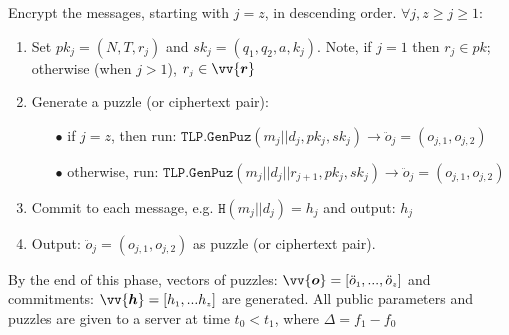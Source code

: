 \begin{enumerate}[leftmargin=.4cm]
Encrypt the  messages, starting with $j=z$, in descending order. $\forall j, z\geq j \geq 1:$
\begin{enumerate}
\item\label{set-pk-in-loop} Set $pk_{\scriptscriptstyle j}=(N,T,r_{\scriptscriptstyle j})$ and $sk_{\scriptscriptstyle j}=(q_{\scriptscriptstyle 1},q_{\scriptscriptstyle 2},a,k_{\scriptscriptstyle j})$. Note, if $j=1$ then $r_{\scriptscriptstyle j} \in pk$; otherwise (when $j>1$), $r_{\scriptscriptstyle j} \in \vv{\bm{r}}$


\item\label{call-RTLP-GenPuz} Generate a puzzle (or ciphertext pair): 
\begin{itemize}
\item[$\bullet$]  if $j=z$, then run: $\mathtt{TLP.GenPuz}(m_{\scriptscriptstyle j}||d_{\scriptscriptstyle j},pk_{\scriptscriptstyle j},sk_{\scriptscriptstyle j})\rightarrow \ddot{o}_{\scriptscriptstyle j}=(o_{\scriptscriptstyle j,1},o_{\scriptscriptstyle j,2})$
 
\item[$\bullet$]  otherwise, run: $\mathtt{TLP.GenPuz}(m_{\scriptscriptstyle j}||d_{\scriptscriptstyle j}||r_{\scriptscriptstyle j+1},pk_{\scriptscriptstyle j},sk_{\scriptscriptstyle j})\rightarrow \ddot{o}_{\scriptscriptstyle j}=(o_{\scriptscriptstyle j,1},o_{\scriptscriptstyle j,2})$
\end{itemize}


\item\label{commit-} Commit to each message, e.g. $\mathtt{H}(m_{\scriptscriptstyle j}||d_{\scriptscriptstyle j})=h_{\scriptscriptstyle j}$ and output:  $h_{\scriptscriptstyle j}$ 
 
\item Output: $\ddot{o}_{\scriptscriptstyle j}=(o_{\scriptscriptstyle j,1},o_{\scriptscriptstyle j,2})$ as puzzle (or ciphertext pair). 

\end{enumerate}
By the end of this phase,  vectors of puzzles: $\vv{\bm{o}}=[\ddot{o}_{\scriptscriptstyle 1},..., \ddot{o}_{\scriptscriptstyle z}]$ and commitments: $\vv{\bm{h}}=[h_{\scriptscriptstyle 1},...h_{\scriptscriptstyle z}]$ are generated. All public parameters and puzzles are given to a server at time $t_{\scriptscriptstyle 0}<t_{\scriptscriptstyle1}$, where  $\Delta=f_{\scriptscriptstyle 1}-f_{\scriptscriptstyle 0}$ %





\end{enumerate}
